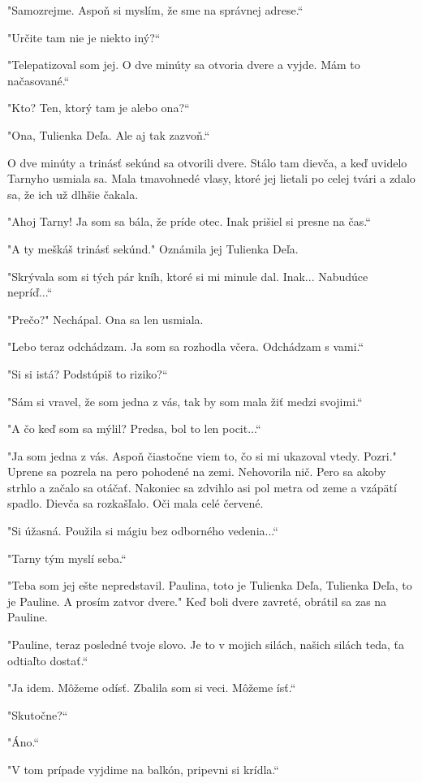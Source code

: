 \documentclass{book}
\begin{document}
"Samozrejme. Aspoň si myslím, že sme na správnej adrese.“

"$ $Určite tam nie je niekto iný?“

"Telepatizoval som jej. O dve minúty sa otvoria dvere a vyjde. Mám to načasované.“

"Kto? Ten, ktorý tam je alebo ona?“

"$ $Ona, Tulienka Deľa. Ale aj tak zazvoň.“

O dve minúty a trinásť sekúnd sa otvorili dvere. Stálo tam dievča, a keď uvidelo 
Tarnyho usmiala sa. Mala tmavohnedé vlasy, ktoré jej lietali po celej tvári a zdalo sa, že ich už dlhšie čakala.

"$ $Ahoj Tarny! Ja som sa bála, že príde otec. Inak prišiel si presne na čas.“

"$ $A ty meškáš trinásť sekúnd."$ $ Oznámila jej Tulienka Deľa.

"Skrývala som si tých pár kníh, ktoré si mi minule dal. Inak... Nabudúce nepríď...“

"Prečo?"$ $ Nechápal. Ona sa len usmiala.

"Lebo teraz odchádzam. Ja som sa rozhodla včera. Odchádzam s vami.“

"Si si istá? Podstúpiš to riziko?“

"Sám si vravel, že som jedna z vás, tak by som mala žiť medzi svojimi.“

"$ $A čo keď som sa mýlil? Predsa, bol to len pocit...“

"Ja som jedna z vás. Aspoň čiastočne viem to, čo si mi ukazoval vtedy. Pozri."$ $ Uprene sa pozrela na pero pohodené na zemi. Nehovorila nič. Pero sa akoby strhlo a začalo sa otáčať. Nakoniec sa zdvihlo asi pol metra od zeme a vzápätí spadlo. Dievča sa rozkašľalo. Oči mala celé červené.

"Si úžasná. Použila si mágiu bez odborného vedenia...“

"Tarny tým myslí seba.“

"Teba som jej ešte nepredstavil. Paulina, toto je Tulienka Deľa, Tulienka Deľa, to je Pauline. A prosím zatvor dvere."$ $ Keď boli dvere zavreté, obrátil sa zas na Pauline.

"Pauline, teraz posledné tvoje slovo. Je to v mojich silách, našich silách teda, ťa odtiaľto dostať.“

"Ja idem. Môžeme odísť. Zbalila som si veci. Môžeme ísť.“

"Skutočne?“

"Áno.“

"V tom prípade vyjdime na balkón, pripevni si krídla.“
\end{document}
